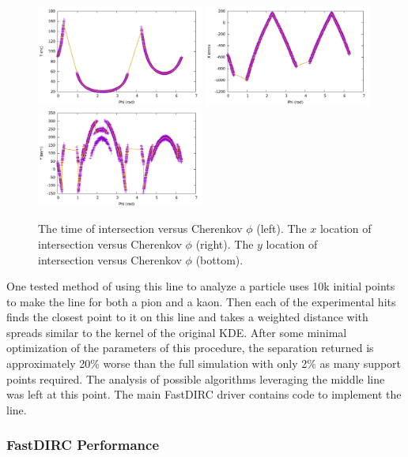 \begin{figure}[!htb]
\centering
\includegraphics[width=0.49\textwidth]{pics/line_overt_v_phi.pdf}
\includegraphics[width=0.49\textwidth]{pics/line_overx_v_phi.pdf}
\includegraphics[width=0.49\textwidth]{pics/line_overy_v_phi.pdf}
\caption{The time of intersection versus Cherenkov $\phi$ (left).  The $x$ location of intersection versus Cherenkov $\phi$ (right).  The $y$ location of intersection versus Cherenkov $\phi$ (bottom).}
\label{fig:single_line_breakout}
\end{figure}

One tested method of using this line to analyze a particle uses 10k initial points to make the line for both a pion and a kaon.  Then each of the experimental hits finds the closest point to it on this line and takes a weighted distance with spreads similar to the kernel of the original KDE.  After some minimal optimization of the parameters of this procedure, the separation returned is approximately 20\% worse than the full simulation with only 2\% as many support points required.  The analysis of possible algorithms leveraging the middle line was left at this point.  The main FastDIRC driver contains code to implement the line.

\clearpage

\subsubsection*{FastDIRC Performance}

